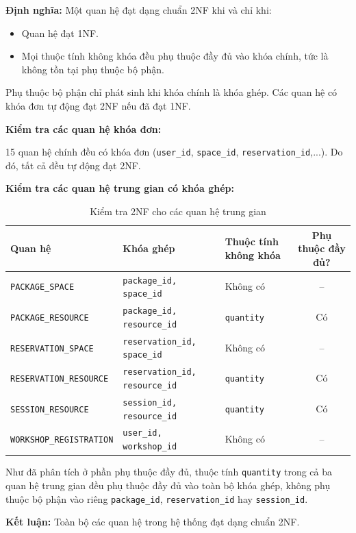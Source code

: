 \textbf{Định nghĩa:} Một quan hệ đạt dạng chuẩn 2NF khi và chỉ khi:
\begin{itemize}
    \item Quan hệ đạt 1NF.
    \item Mọi thuộc tính không khóa đều phụ thuộc đầy đủ vào khóa chính, tức là không tồn tại phụ thuộc bộ phận.
\end{itemize}

Phụ thuộc bộ phận chỉ phát sinh khi khóa chính là khóa ghép. Các quan hệ có khóa đơn tự động đạt 2NF nếu đã đạt 1NF.

\textbf{Kiểm tra các quan hệ khóa đơn:}

15 quan hệ chính đều có khóa đơn (\texttt{user\_id}, \texttt{space\_id}, \texttt{reservation\_id},...). Do đó, tất cả đều tự động đạt 2NF.

\textbf{Kiểm tra các quan hệ trung gian có khóa ghép:}

\begin{table}[htbp]
\centering
\begin{tabularx}{\linewidth}{|l|X|l|c|}
\hline
\textbf{Quan hệ} & \textbf{Khóa ghép} & \textbf{Thuộc tính không khóa} & \textbf{Phụ thuộc đầy đủ?} \\
\hline
\texttt{PACKAGE\_SPACE} & \texttt{package\_id, space\_id} & Không có & -- \\
\hline
\texttt{PACKAGE\_RESOURCE} & \texttt{package\_id, resource\_id} & \texttt{quantity} & Có \\
\hline
\texttt{RESERVATION\_SPACE} & \texttt{reservation\_id, space\_id} & Không có & -- \\
\hline
\texttt{RESERVATION\_RESOURCE} & \texttt{reservation\_id, resource\_id} & \texttt{quantity} & Có \\
\hline
\texttt{SESSION\_RESOURCE} & \texttt{session\_id, resource\_id} & \texttt{quantity} & Có \\
\hline
\texttt{WORKSHOP\_REGISTRATION} & \texttt{user\_id, workshop\_id} & Không có & -- \\
\hline
\end{tabularx}
\caption{Kiểm tra 2NF cho các quan hệ trung gian}
\end{table}

Như đã phân tích ở phần phụ thuộc đầy đủ, thuộc tính \texttt{quantity} trong cả ba quan hệ trung gian đều phụ thuộc đầy đủ vào toàn bộ khóa ghép, không phụ thuộc bộ phận vào riêng \texttt{package\_id}, \texttt{reservation\_id} hay \texttt{session\_id}.

\textbf{Kết luận:} Toàn bộ các quan hệ trong hệ thống đạt dạng chuẩn 2NF.

